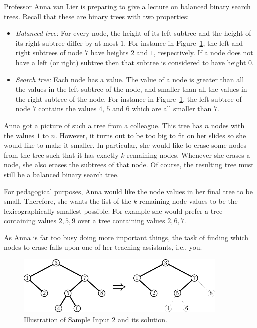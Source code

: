 
Professor Anna van Lier is preparing to give a lecture on balanced binary search trees.
Recall that these are binary trees with two properties:
\begin{itemize}
\item \emph{Balanced tree:} For every node, the height of its left subtree and the height
of its right subtree differ by at most $1$.  For instance in
Figure~\ref{fig:avltree}, the left and right subtrees of node $7$ have
heights $2$ and $1$, respectively.  If a node does not have a left (or
right) subtree then that subtree is considered to have height $0$.
\item \emph{Search tree:} Each node has a value. The value of a node is greater than all the values
in the left subtree of the node, and smaller than all the values
in the right subtree of the node.  For instance in
Figure~\ref{fig:avltree}, the left subtree of node $7$ contains the
values $4$, $5$ and $6$ which are all smaller than $7$.
\end{itemize}

Anna got a picture of such a tree from a colleague.  This tree has $n$ nodes with the values $1$ to $n$.
However, it turns out to be too big to fit on her slides so she would like to make it smaller.
In particular, she would like to erase some nodes from the tree such
that it has exactly $k$ remaining nodes.
Whenever she erases a node, she also erases the subtrees of that node.
Of course, the resulting tree must still be a balanced binary search tree.

For pedagogical purposes, Anna would like the node values in her final
tree to be small.  Therefore, she wants the list of the $k$ remaining
node values to be the lexicographically smallest possible.  For
example she would prefer a tree containing values $2, 5, 9$ over a tree
containing values $2, 6, 7$.

As Anna is far too busy doing more important things, the task of
finding which nodes to erase falls upon one of her teaching assistants, i.e., you.

\begin{figure}[!h]
\begin{center}
\includegraphics[width=0.9\textwidth]{sample1}
\caption{Illustration of Sample Input 2 and its solution.}
\label{fig:avltree}
\end{center}
\vspace{-1cm}
\end{figure}


